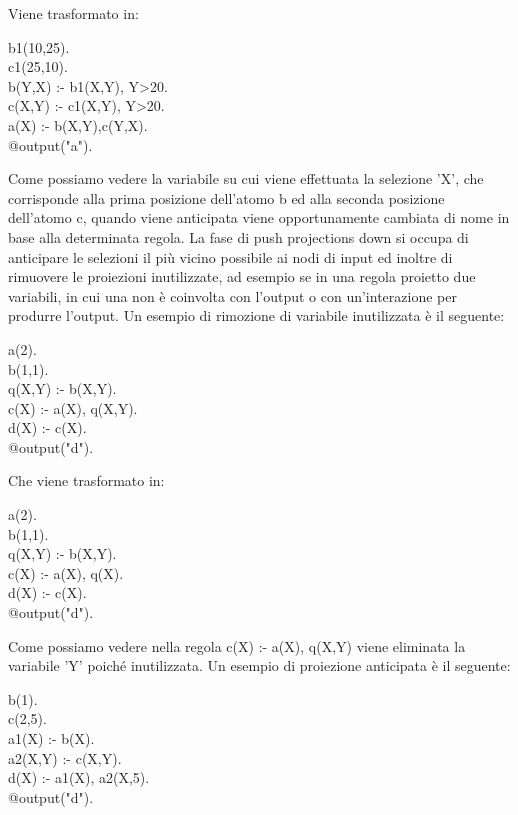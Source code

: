 Viene trasformato in:

\begin{algorithm}[h]
	b1(10,25). \\
	c1(25,10). \\
	b(Y,X) :- b1(X,Y), Y>20. \\
	c(X,Y) :- c1(X,Y), Y>20. \\
	a(X) :- b(X,Y),c(Y,X). \\
	@output("a").
\end{algorithm}

Come possiamo vedere la variabile su cui viene effettuata la selezione 'X', che corrisponde alla prima posizione dell'atomo b ed alla seconda posizione dell'atomo c, quando viene anticipata viene opportunamente cambiata di nome in base alla determinata regola. \newline \newline
La fase di push projections down si occupa di anticipare le selezioni il più vicino possibile ai nodi di input ed inoltre di rimuovere le proiezioni inutilizzate, ad esempio se in una regola proietto due variabili, in cui una non è coinvolta con l'output o con un'interazione per produrre l'output. Un esempio di rimozione di variabile inutilizzata è il seguente:

\begin{algorithm}[h]
	a(2). \\
	b(1,1). \\
	q(X,Y) :- b(X,Y). \\
	c(X) :- a(X), q(X,Y). \\
	d(X) :- c(X). \\
	@output("d").
\end{algorithm}

Che viene trasformato in:

\begin{algorithm}[h]
	a(2). \\
	b(1,1). \\
	q(X,Y) :- b(X,Y). \\
	c(X) :- a(X), q(X). \\
	d(X) :- c(X). \\
	@output("d").
\end{algorithm}

Come possiamo vedere nella regola c(X) :- a(X), q(X,Y) viene eliminata la variabile 'Y' poiché inutilizzata. \newline
Un esempio di proiezione anticipata è il seguente: 

\begin{algorithm}[h]
	b(1). \\
	c(2,5). \\
	a1(X) :- b(X). \\
	a2(X,Y) :- c(X,Y). \\
	d(X) :- a1(X), a2(X,5). \\
	@output("d").
\end{algorithm}


